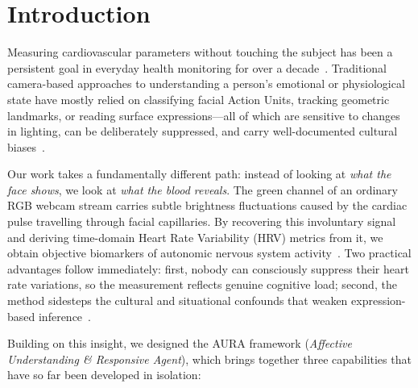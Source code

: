\documentclass[conference]{IEEEtran}
\begin{document}
\section{Introduction}
\label{sec:introduction}

Measuring cardiovascular parameters without touching the subject has
been a persistent goal in everyday health monitoring for over a
decade~\cite{verkruysse2008remote, poh2011advancements}. Traditional
camera-based approaches to understanding a person's emotional or
physiological state have mostly relied on classifying facial Action
Units, tracking geometric landmarks, or reading surface
expressions---all of which are sensitive to changes in lighting,
can be deliberately suppressed, and carry well-documented cultural
biases~\cite{li2014remote, chen2018deepphys}.

Our work takes a fundamentally different path: instead of looking
at \emph{what the face shows}, we look at \emph{what the blood
reveals}. The green channel of an ordinary RGB webcam stream carries
subtle brightness fluctuations caused by the cardiac pulse travelling
through facial capillaries. By recovering this involuntary signal
and deriving time-domain Heart Rate Variability (HRV) metrics from it,
we obtain objective biomarkers of autonomic nervous system
activity~\cite{shaffer2017overview}. Two practical advantages follow
immediately: first, nobody can consciously suppress their heart rate
variations, so the measurement reflects genuine cognitive load;
second, the method sidesteps the cultural and situational confounds
that weaken expression-based inference~\cite{barrett2019emotional}.

Building on this insight, we designed the \textsc{AURA} framework
(\textit{Affective Understanding \& Responsive Agent}), which brings
together three capabilities that have so far been developed in
isolation:
\end{document}
